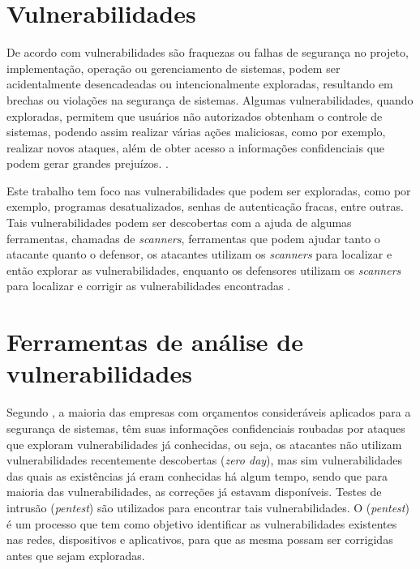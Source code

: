 \section{Vulnerabilidades}
\label{vulnerabilidades:ameaças}
De acordo com  vulnerabilidades são fraquezas ou falhas de segurança no projeto, implementação, operação ou gerenciamento de sistemas, podem ser acidentalmente desencadeadas ou intencionalmente exploradas, resultando em brechas ou violações na segurança de sistemas. Algumas vulnerabilidades, quando exploradas, permitem que  usuários não autorizados obtenham o controle de sistemas, podendo assim realizar várias ações maliciosas, como por exemplo, realizar novos ataques, além de obter acesso a informações confidenciais que podem gerar grandes prejuízos. \cite{nakamura2007segurancca}.

Este trabalho tem foco nas vulnerabilidades que podem ser exploradas, como por exemplo, programas desatualizados, senhas de autenticação fracas, entre outras. Tais vulnerabilidades podem ser descobertas com a ajuda de algumas ferramentas, chamadas de \textit{scanners}, ferramentas que podem ajudar tanto o atacante quanto o defensor, os atacantes utilizam os \textit{scanners} para localizar e então explorar as vulnerabilidades, enquanto  os defensores utilizam  os \textit{scanners} para localizar e corrigir as vulnerabilidades encontradas \cite{fischer2014cybersecurity}.

\section{Ferramentas de análise de vulnerabilidades}
\label{cap:conceitos:sec:Ferramentas}
Segundo , a maioria das empresas com orçamentos consideráveis aplicados para a segurança de sistemas, têm suas informações confidenciais roubadas por ataques que exploram vulnerabilidades já conhecidas, ou seja, os atacantes não utilizam vulnerabilidades recentemente descobertas (\textit{zero day}), mas sim vulnerabilidades das quais as existências já eram conhecidas há algum tempo, sendo que para maioria das vulnerabilidades, as correções já estavam disponíveis. Testes de intrusão (\textit{pentest}) são utilizados para encontrar tais vulnerabilidades. O (\textit{pentest}) é um processo que tem como objetivo identificar as vulnerabilidades existentes nas redes, dispositivos e aplicativos, para que as mesma possam ser corrigidas antes que sejam exploradas.

